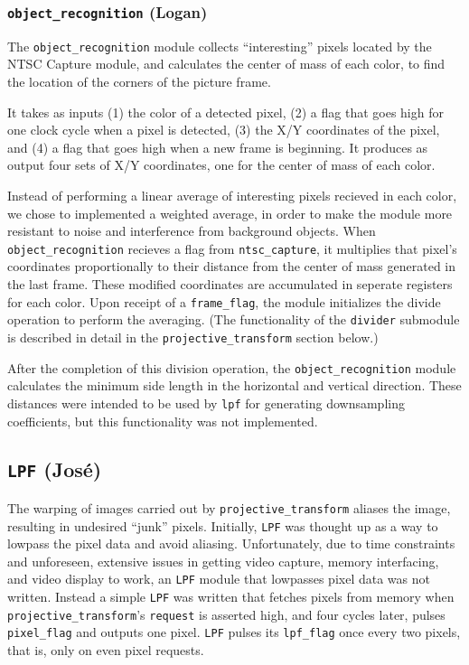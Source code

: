\documentclass[10pt]{article}
\begin{document}
\subsubsection{{\tt object\_recognition} (Logan)}
The {\tt object\_recognition} module collects ``interesting'' pixels located by the NTSC Capture module, and calculates the center of mass of each color, to find the location of the corners of the picture frame.

It takes as inputs (1) the color of a detected pixel, (2) a flag that goes high for one clock cycle when a pixel is detected, (3) the X/Y coordinates of the pixel, and (4) a flag that goes high when a new frame is beginning. It produces as output four sets of X/Y coordinates, one for the center of mass of each color.

Instead of performing a linear average of interesting pixels recieved in each color, we chose to implemented a weighted average, in order to make the module more resistant to noise and interference from background objects. When {\tt object\_recognition} recieves a flag from {\tt ntsc\_capture}, it multiplies that pixel's coordinates proportionally to their distance from the center of mass generated in the last frame. These modified coordinates are accumulated in seperate registers for each color. Upon receipt of a {\tt frame\_flag}, the module initializes the divide operation to perform the averaging. (The functionality of the {\tt divider} submodule is described in detail in the {\tt projective\_transform} section below.)

After the completion of this division operation, the {\tt object\_recognition} module calculates the minimum side length in the horizontal and vertical direction. These distances were intended to be used by {\tt lpf} for generating downsampling coefficients, but this functionality was not implemented.

\subsection{{\tt LPF} (Jos\'{e})}
The warping of images carried out by {\tt projective\_transform} aliases the image, resulting in undesired ``junk'' pixels. Initially, {\tt LPF} was thought up as a way to lowpass the pixel data and avoid aliasing. Unfortunately, due to time constraints and unforeseen, extensive issues in getting video capture, memory interfacing, and video display to work, an {\tt LPF} module that lowpasses pixel data was not written. Instead a simple {\tt LPF} was written that fetches pixels from memory when {\tt projective\_transform}'s {\tt request} is asserted high, and four cycles later, pulses {\tt pixel\_flag} and outputs one pixel. {\tt LPF} pulses its {\tt lpf\_flag} once every two pixels, that is, only on even pixel requests.
\end{document}
